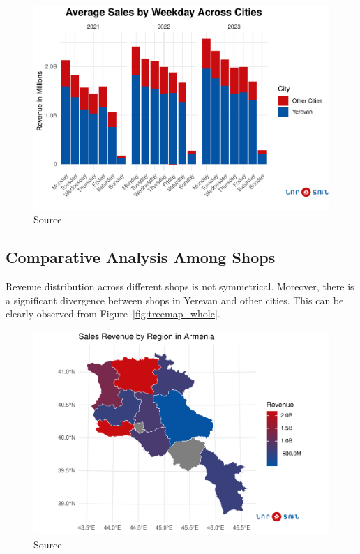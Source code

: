 \documentclass[conference]{IEEEtran}
\begin{document}
\begin{figure}[htbp]
\centering
\includegraphics[width=\columnwidth,keepaspectratio]{./figures/sales_by_weekday.pdf}
\caption{Source \cite{weekly}}
\label{fig:weekday}
\end{figure}


\subsection{Comparative Analysis Among Shops}
Revenue distribution across different shops is not symmetrical. Moreover, there is a significant divergence between shops in Yerevan and other cities. This can be clearly observed from Figure~\ref{fig:treemap_whole}. 

\begin{figure}[htbp]
\centering
\includegraphics[width=\columnwidth,keepaspectratio]{./figures/sales_by_map_armenia.pdf}
\caption{Source \cite{mapArmenia}}
\label{fig:sales_by_map_armenia}
\end{figure}
\end{document}
